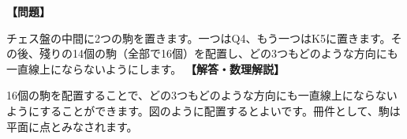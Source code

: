 \documentclass[10pt,a4paper,oneside,openany]{ltjsbook}
\begin{document}
\begin{tcolorbox}[colback=softblue,colframe=primaryblue,title=\textbf{第 317 問：駒を配置するパズル （原題: A PUZZLE WITH PAWNS.）},arc=2mm,boxrule=1pt,breakable]
\textbf{【問題】}\par\vspace{0.3em}
チェス盤の中間に2つの駒を置きます。一つはQ4、もう一つはK5に置きます。その後、殘りの14個の駒（全部で16個）を配置し、どの3つもどのような方向にも一直線上にならないようにします。
\tcblower
\textbf{【解答・数理解説】}\par\vspace{0.3em}
16個の駒を配置することで、どの3つもどのような方向にも一直線上にならないようにすることができます。図のように配置するとよいです。冊件として、駒は平面に点とみなされます。
\end{tcolorbox}
\end{document}
